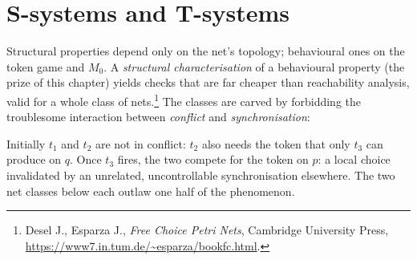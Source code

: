 \section{S-systems and T-systems}

Structural properties depend only on the net's topology; behavioural ones on the token game and $M_0$. A \emph{structural characterisation} of a behavioural property (the prize of this chapter) yields checks that are far cheaper than reachability analysis, valid for a whole class of nets.\footnote{Desel J., Esparza J., \emph{Free Choice Petri Nets}, Cambridge University Press, \url{https://www7.in.tum.de/~esparza/bookfc.html}.} The classes are carved by forbidding the troublesome interaction between \emph{conflict} and \emph{synchronisation}:
\begin{center}
\end{center}
Initially $t_1$ and $t_2$ are not in conflict: $t_2$ also needs the token that only $t_3$ can produce on $q$. Once $t_3$ fires, the two compete for the token on $p$: a local choice invalidated by an unrelated, uncontrollable synchronisation elsewhere. The two net classes below each outlaw one half of the phenomenon.

